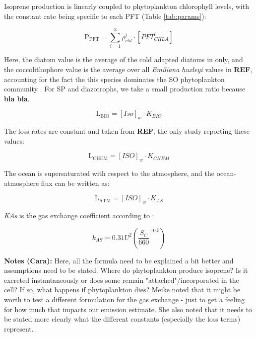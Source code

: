 \documentclass[draft,linenumbers]{agujournal}
\begin{document}
Isoprene production is linearly coupled to phytoplankton chlorophyll levels, with the constant rate being specific to each PFT (Table \ref{tab:params}):
\begin{linenomath*}
\begin{equation}
\mathrm{P}_{\mathrm{PFT}} = \sum^{3}_{i=1}\rho^{i}_{chl} \cdot [PFT^{i}_{CHLA}]
\label{eq:ppft}
\end{equation}
\end{linenomath*}
Here, the diatom value is the average of the cold adapted diatoms in \citet{booge2016can} only, and the coccolithophore value is the average over all \textit{Emiliana huxleyi} values in \textbf{REF}, accounting for the fact the this species dominates the SO phytoplankton community \citep{Smith2017,Saavedra-Pellitero2014}. For SP and diazotrophs, we take a small production ratio because \textbf{bla bla}.

\begin{linenomath*}
\begin{equation}
\mathrm{L}_{\mathrm{BIO}} = [Iso]_{w} \cdot K_{BIO}
\label{eq:latm}
\end{equation}
\end{linenomath*}

The loss rates are constant and taken from \textbf{REF}, the only study reporting these values:
\begin{linenomath*}
\begin{equation}
\mathrm{L}_{\mathrm{CHEM}} = [ISO]_{w} \cdot K_{CHEM}
\label{eq:lchem}
\end{equation}
\end{linenomath*}

The ocean is supersaturated with respect to the atmosphere, and the ocean-atmosphere flux can be written as: 
\begin{linenomath*}
\begin{equation}
\mathrm{L}_{\mathrm{ATM}} = [ISO]_{w} \cdot K_{AS}
\label{eq:lbio}
\end{equation}
\end{linenomath*}

\textit{KAs} is the gas exchange coefficient according to \citet{wanninkhof1992relationship}:
\begin{linenomath*}
\begin{equation}
k_{AS} = 0.31U^{2} \left(\frac{S_{C}}{660}^{-0.5}\right)
\label{eq:kas}
\end{equation}
\end{linenomath*}

\textbf{Notes (Cara):}
Here, all the formula need to be explained a bit better and assumptions need to be stated. Where do phytoplankton produce isoprene? Is it excreted instantaneously or does some remain "attached"/incorporated in the cell? If so, what happens if phytoplankton dies? Meike noted that it might be worth to test a different formulation for the gas exchange - just to get a feeling for how much that impacts our emission estimate. She also noted that it needs to be stated more clearly what the different constants (especially the loss terms) represent.
\end{document}
